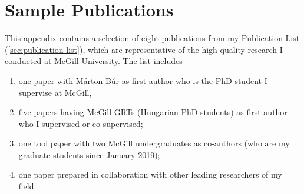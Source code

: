 \chapter{Sample Publications}
\label{sec:sample-publications}


This appendix contains a selection of eight publications from my Publication List (\autoref{sec:publication-list}), which are representative of the high-quality research I conducted at McGill University. The list includes 
\begin{enumerate}[leftmargin=0.5cm]
\item one paper with Márton Búr as first author who is the PhD student I supervise at McGill, 
\item five papers having McGill GRTs (Hungarian PhD students) as first author who I supervised or co-supervised;
\item one tool paper with two McGill undergraduates as co-authors (who are my graduate students since January 2019);
\item one paper prepared in collaboration with other leading researchers of my field.
\end{enumerate}

\vspace{1cm}

